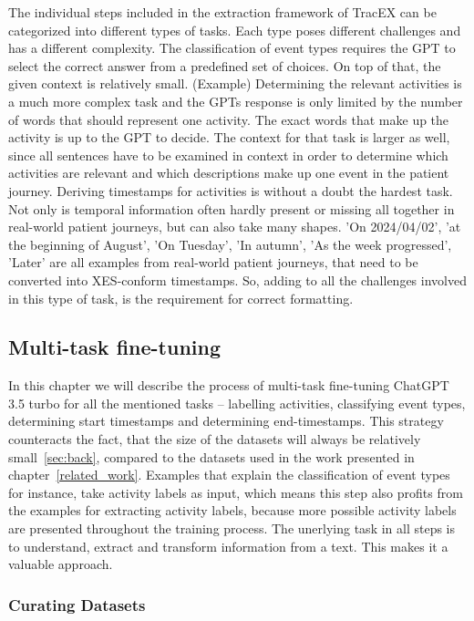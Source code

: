 The individual steps included in the extraction framework of TracEX can be categorized into different types of tasks. Each type poses different challenges and has a different complexity. The classification of event types requires the GPT to select the correct answer from a predefined set of choices. On top of that, the given context is relatively small. (Example) Determining the relevant activities is a much more complex task and the GPTs response is only limited by the number of words that should represent one activity. The exact words that make up the activity is up to the GPT to decide. The context for that task is larger as well, since all sentences have to be examined in context in order to determine which activities are relevant and which descriptions make up one event in the patient journey. Deriving timestamps for activities is without a doubt the hardest task. Not only is temporal information often hardly present or missing all together in real-world patient journeys, but can also take many shapes. 'On 2024/04/02', 'at the beginning of August', 'On Tuesday', 'In autumn', 'As the week progressed', 'Later' are all examples from real-world patient journeys, that need to be converted into XES-conform timestamps. So, adding to all the challenges involved in this type of task, is the requirement for correct formatting.

\subsection{Multi-task fine-tuning}\label{sec:multi-task-ft}
In this chapter we will describe the process of multi-task fine-tuning ChatGPT 3.5 turbo for all the mentioned tasks – labelling activities, classifying event types,  determining start timestamps and determining end-timestamps. This strategy counteracts the fact, that the size of the datasets will always be relatively small~\ref{sec:back}, compared to the datasets used in the work presented in chapter~\ref{related_work}. Examples that explain the classification of event types for instance, take activity labels as input, which means this step also profits from the examples for extracting activity labels, because more possible activity labels are presented throughout the training process. The unerlying task in all steps is to understand, extract and transform information from a text. This makes it a valuable approach.

\subsubsection{Curating Datasets}
